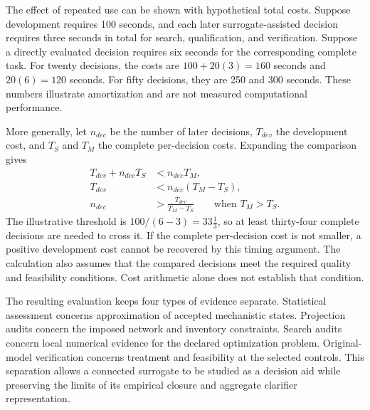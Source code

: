 The effect of repeated use can be shown with hypothetical total costs. Suppose development requires 100 seconds, and each later surrogate-assisted decision requires three seconds in total for search, qualification, and verification. Suppose a directly evaluated decision requires six seconds for the corresponding complete task. For twenty decisions, the costs are $100+20(3)=160$ seconds and $20(6)=120$ seconds. For fifty decisions, they are 250 and 300 seconds. These numbers illustrate amortization and are not measured computational performance.

More generally, let $n_{dec}$ be the number of later decisions, $T_{dev}$ the development cost, and $T_S$ and $T_M$ the complete per-decision costs. Expanding the comparison gives
\[
\begin{aligned}
T_{dev}+n_{dec}T_S&<n_{dec}T_M,\\
T_{dev}&<n_{dec}(T_M-T_S),\\
n_{dec}&>\frac{T_{dev}}{T_M-T_S}\qquad\text{when }T_M>T_S.
\end{aligned}
\]
The illustrative threshold is $100/(6-3)=33\tfrac13$, so at least thirty-four complete decisions are needed to cross it. If the complete per-decision cost is not smaller, a positive development cost cannot be recovered by this timing argument. The calculation also assumes that the compared decisions meet the required quality and feasibility conditions. Cost arithmetic alone does not establish that condition.

The resulting evaluation keeps four types of evidence separate. Statistical assessment concerns approximation of accepted mechanistic states. Projection audits concern the imposed network and inventory constraints. Search audits concern local numerical evidence for the declared optimization problem. Original-model verification concerns treatment and feasibility at the selected controls. This separation allows a connected surrogate to be studied as a decision aid while preserving the limits of its empirical closure and aggregate clarifier representation.
